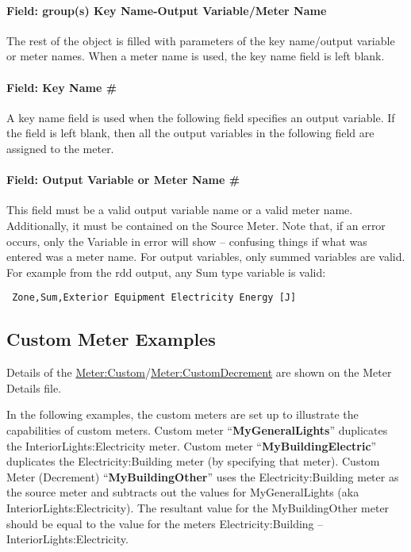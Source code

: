\paragraph{Field: group(s) Key Name-Output Variable/Meter Name}\label{field-groups-key-name-output-variablemeter-name-1}

The rest of the object is filled with parameters of the key name/output variable or meter names. When a meter name is used, the key name field is left blank.

\paragraph{Field: Key Name \#}\label{field-key-name-1}

A key name field is used when the following field specifies an output variable. If the field is left blank, then all the output variables in the following field are assigned to the meter.

\paragraph{Field: Output Variable or Meter Name \#}\label{field-output-variable-or-meter-name-1}

This field must be a valid output variable name or a valid meter name. Additionally, it must be contained on the Source Meter. Note that, if an error occurs, only the Variable in error will show -- confusing things if what was entered was a meter name. For output variables, only summed variables are valid. For example from the rdd output, any Sum type variable is valid:
\begin{lstlisting}
 Zone,Sum,Exterior Equipment Electricity Energy [J]
\end{lstlisting}

\subsection{Custom Meter Examples}\label{custom-meter-examples}

Details of the \hyperref[metercustom]{Meter:Custom}/\hyperref[metercustomdecrement]{Meter:CustomDecrement} are shown on the Meter Details file.

In the following examples, the custom meters are set up to illustrate the capabilities of custom meters. Custom meter ``\textbf{MyGeneralLights}'' duplicates the InteriorLights:Electricity meter. Custom meter ``\textbf{MyBuildingElectric}'' duplicates the Electricity:Building meter (by specifying that meter). Custom Meter (Decrement) ``\textbf{MyBuildingOther}'' uses the Electricity:Building meter as the source meter and subtracts out the values for MyGeneralLights (aka InteriorLights:Electricity). The resultant value for the MyBuildingOther meter should be equal to the value for the meters Electricity:Building -- InteriorLights:Electricity.

